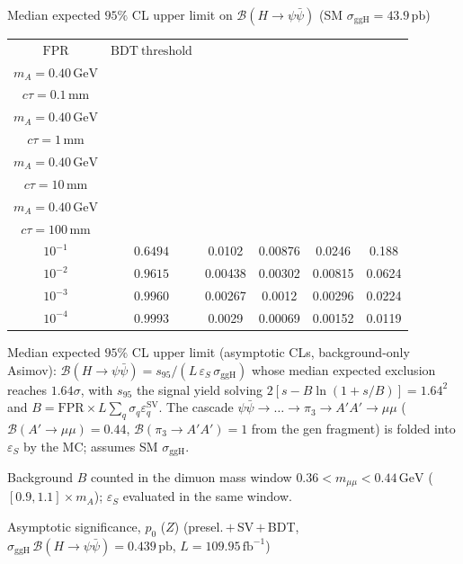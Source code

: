 \documentclass[10pt,a4paper]{article}
\begin{document}
{\vspace{12pt}

Median expected $95\%$ CL upper limit on $\mathcal{B}(H\to\psi\bar{\psi})$ (SM $\sigma_{\mathrm{ggH}}=43.9\,\mathrm{pb}$)

\begin{tabular}{cccccc}
\toprule
$\mathrm{FPR}$ & $\mathrm{BDT\ threshold}$ & \shortstack{$m_{\pi}=4\,\mathrm{GeV}$\\$m_{A}=0.40\,\mathrm{GeV}$\\$c\tau=0.1\,\mathrm{mm}$} & \shortstack{$m_{\pi}=4\,\mathrm{GeV}$\\$m_{A}=0.40\,\mathrm{GeV}$\\$c\tau=1\,\mathrm{mm}$} & \shortstack{$m_{\pi}=4\,\mathrm{GeV}$\\$m_{A}=0.40\,\mathrm{GeV}$\\$c\tau=10\,\mathrm{mm}$} & \shortstack{$m_{\pi}=4\,\mathrm{GeV}$\\$m_{A}=0.40\,\mathrm{GeV}$\\$c\tau=100\,\mathrm{mm}$} \\
\midrule
$10^{-1}$ & $0.6494$ & 0.0102 & 0.00876 & 0.0246 & 0.188\\
$10^{-2}$ & $0.9615$ & 0.00438 & 0.00302 & 0.00815 & 0.0624\\
$10^{-3}$ & $0.9960$ & 0.00267 & 0.0012 & 0.00296 & 0.0224\\
$10^{-4}$ & $0.9993$ & 0.0029 & 0.00069 & 0.00152 & 0.0119\\
\bottomrule
\end{tabular}

{\small Median expected $95\%$ CL upper limit (asymptotic CLs, background-only Asimov): $\mathcal{B}(H\to\psi\bar{\psi})=s_{95}/(L\,\varepsilon_S\,\sigma_{\mathrm{ggH}})$ whose median expected exclusion reaches $1.64\sigma$, with $s_{95}$ the signal yield solving $2[s-B\ln(1{+}s/B)]=1.64^2$ and $B=\mathrm{FPR}\times L\sum_q\sigma_q\varepsilon_q^{\mathrm{SV}}$. The cascade $\psi\bar{\psi}\to\ldots\to\pi_3\to A'A'\to\mu\mu$ ($\mathcal{B}(A'\to\mu\mu)=0.44$, $\mathcal{B}(\pi_3\to A'A')=1$ from the gen fragment) is folded into $\varepsilon_S$ by the MC; assumes SM $\sigma_{\mathrm{ggH}}$.}

{\small Background $B$ counted in the dimuon mass window $0.36<m_{\mu\mu}<0.44\,\mathrm{GeV}$ ($[0.9,1.1]\times m_A$); $\varepsilon_S$ evaluated in the same window.}

\vspace{12pt}

Asymptotic significance, $p_0$ ($Z$) (presel.\,$+$\,SV\,$+$\,BDT, $\sigma_{\mathrm{ggH}}\,\mathcal{B}(H\to\psi\bar{\psi})=0.439\,\mathrm{pb}$, $L=109.95\,\mathrm{fb}^{-1}$)

}
\end{document}
